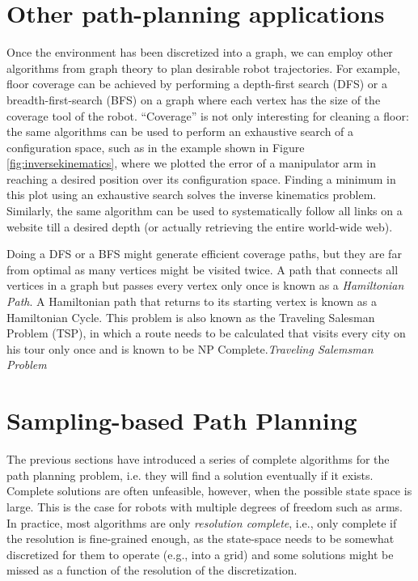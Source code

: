 
\section{Other path-planning applications}
Once the environment has been discretized into a graph, we can employ other algorithms from graph theory to plan desirable robot trajectories. For example, floor coverage can be achieved by performing a depth-first search (DFS) or a breadth-first-search (BFS) on a graph where each vertex has the size of the coverage tool of the robot. ``Coverage'' is not only interesting for cleaning a floor: the same algorithms can be used to perform an exhaustive search of a configuration space, such as in the example shown in Figure \ref{fig:inversekinematics}, where we plotted the error of a manipulator arm in reaching a desired position over its configuration space. Finding a minimum in this plot using an exhaustive search solves the inverse kinematics problem. Similarly, the same algorithm can be used to systematically follow all links on a website till a desired depth (or actually retrieving the entire world-wide web).

Doing a DFS or a BFS might generate efficient coverage paths, but they are far from optimal as many vertices might be visited twice. A path that connects all vertices in a graph but passes every vertex only once is known as a \emph{Hamiltonian Path}. A Hamiltonian path that returns to its starting vertex is known as a Hamiltonian Cycle. This problem is also known as the Traveling Salesman Problem (TSP), in which a route needs to be calculated that visits every city on his tour only once and is known to be NP Complete.\emph{Traveling Salemsman Problem}

\section{Sampling-based Path Planning}
The previous sections have introduced a series of complete algorithms for the path planning problem, i.e. they will find a solution eventually if it exists. Complete solutions are often unfeasible, however, when the possible state space is large. This is the case for robots with multiple degrees of freedom such as arms. In practice, most algorithms are only \emph{resolution complete}, i.e., only complete if the resolution is fine-grained enough, as the state-space needs to be somewhat discretized for them to operate (e.g., into a grid) and some solutions might be missed as a function of the resolution of the discretization.

